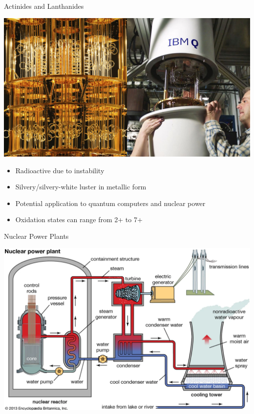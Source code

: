 \documentclass[11pt]{beamer}
\begin{document}
\begin{frame}{Actinides and Lanthanides}
  \begin{center}
    \includegraphics[scale=0.3]{quantum_comp}
  \end{center}

  \begin{itemize}
  \item Radioactive due to instability
  \item Silvery/silvery-white luster in metallic form
  \item Potential application to quantum computers and
    nuclear power
  \item Oxidation states can range from 2+ to 7+
  \end{itemize}
\end{frame}

\begin{frame}{Nuclear Power Plants}
  \begin{center}
    \includegraphics[width=\linewidth]{nuclear_plant}
  \end{center}
\end{frame}
\end{document}
